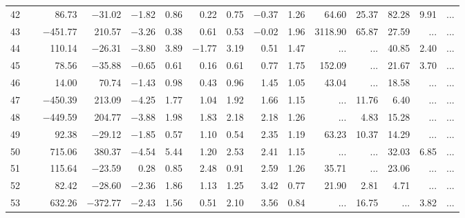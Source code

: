 \begin{table*}[p]
{\begin{tabular}{l@{ }r@{ \ }rr@{ \ }rr@{ \ }rrrr@{ \ }r@{ \ }r@{ \ }r@{ \ }r}
 42   \ \dotfill \  &     86.73 &   $-$31.02 &  $-$1.82 &   0.86 &    0.22 &   0.75
 &  $-$0.37 &   1.26
  &       64.60 &       25.37 &       82.28 &        9.91 &    ...       \\     
 43   \ \dotfill \  &  $-$451.77 &    210.57 &  $-$3.26 &   0.38 &    0.61 &   0.53
 &  $-$0.02 &   1.96
  &     3118.90 &       65.87 &       27.59 &    ...     &    ...       \\     
 44   \ \dotfill \  &    110.14 &   $-$26.31 &  $-$3.80 &   3.89 &  $-$1.77 &   3.19
 &    0.51 &   1.47
  &    ...     &    ...     &       40.85 &        2.40 &    ...       \\     
 45   \ \dotfill \  &     78.56 &   $-$35.88 &  $-$0.65 &   0.61 &    0.16 &   0.61
 &    0.77 &   1.75
  &      152.09 &    ...     &       21.67 &        3.70 &    ...       \\     
 46   \ \dotfill \  &     14.00 &     70.74 &  $-$1.43 &   0.98 &    0.43 &   0.96
 &    1.45 &   1.05
  &       43.04 &    ...     &       18.58 &    ...     &    ...       \\     
 47   \ \dotfill \  &  $-$450.39 &    213.09 &  $-$4.25 &   1.77 &    1.04 &   1.92
 &    1.66 &   1.15
  &    ...     &       11.76 &        6.40 &    ...     &    ...       \\     
 48   \ \dotfill \  &  $-$449.59 &    204.77 &  $-$3.88 &   1.98 &    1.83 &   2.18
 &    2.18 &   1.26
  &    ...     &        4.83 &       15.28 &    ...     &    ...       \\     
 49   \ \dotfill \  &     92.38 &   $-$29.12 &  $-$1.85 &   0.57 &    1.10 &   0.54
 &    2.35 &   1.19
  &       63.23 &       10.37 &       14.29 &    ...     &    ...       \\     
 50   \ \dotfill \  &    715.06 &    380.37 &  $-$4.54 &   5.44 &    1.20 &   2.53
 &    2.41 &   1.15
  &    ...     &    ...     &       32.03 &        6.85 &    ...       \\     
 51   \ \dotfill \  &    115.64 &   $-$23.59 &    0.28 &   0.85 &    2.48 &   0.91
 &    2.59 &   1.26
  &       35.71 &    ...     &       23.06 &    ...     &    ...       \\     
 52   \ \dotfill \  &     82.42 &   $-$28.60 &  $-$2.36 &   1.86 &    1.13 &   1.25
 &    3.42 &   0.77
  &       21.90 &        2.81 &        4.71 &    ...     &    ...       \\     
 53   \ \dotfill \  &    632.26 &  $-$372.77 &  $-$2.43 &   1.56 &    0.51 &   2.10
 &    3.56 &   0.84
  &    ...     &       16.75 &    ...     &        3.82 &    ...       \\     

\end{tabular}}
\end{table*}
